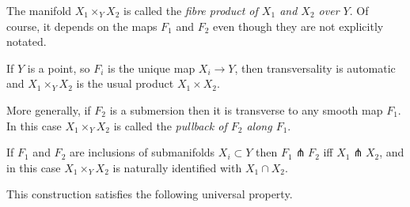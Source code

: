 \documentclass[a4paper,11pt]{article}
\begin{document}
	\begin{defi}
		The manifold $X_1 \times_Y X_2$ is called the \emph{fibre product of $X_1$ and $X_2$ over $Y$}. Of course, it depends on the maps $F_1$ and $F_2$ even though they are not explicitly notated.
	\end{defi}

	\begin{ex}
		If $Y$ is a point, so $F_i$ is the unique map $X_i \to Y$, then transversality is automatic and $X_1 \times_Y X_2$ is the usual product $X_1 \times X_2$.
	\end{ex}

	\begin{ex}
		More generally, if $F_2$ is a submersion then it is transverse to any smooth map $F_1$. In this case $X_1 \times_Y X_2$ is called the \emph{pullback of $F_2$ along $F_1$}.
	\end{ex}

	\begin{ex}
		If $F_1$ and $F_2$ are inclusions of submanifolds $X_i \subset Y$ then $F_1 \pitchfork F_2$ iff $X_1 \pitchfork X_2$, and in this case $X_1 \times_Y X_2$ is naturally identified with $X_1 \cap X_2$.
	\end{ex}

	This construction satisfies the following universal property.
\end{document}
